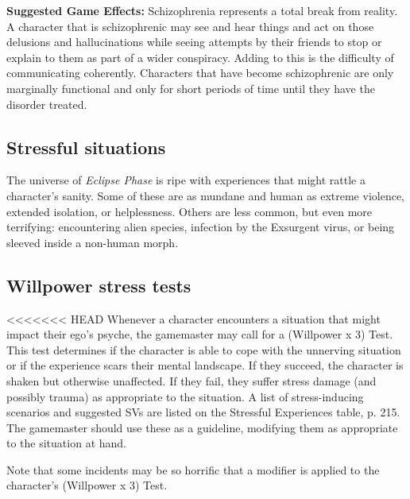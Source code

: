 \textbf{Suggested Game Effects:} Schizophrenia represents a total break from reality. A character that is schizophrenic may see and hear things and act on those delusions and hallucinations while seeing attempts by their friends to stop or explain to them as part of a wider conspiracy. Adding to this is the difficulty of communicating coherently. Characters that have become schizophrenic are only marginally functional and only for short periods of time until they have the disorder treated.


\subsection{Stressful situations}
\label{sec:stressful-situations}

The universe of \emph{Eclipse Phase} is ripe with experiences that might rattle a character’s sanity. Some of these are as mundane and human as extreme violence, extended isolation, or helplessness. Others are less common, but even more terrifying: encountering alien species, infection by the Exsurgent virus, or being sleeved inside a non-human morph.


\subsection{Willpower stress tests}
\label{sec:willpower-stress-tests}

<<<<<<< HEAD
Whenever a character encounters a situation that might impact their ego’s psyche, the gamemaster may call for a (Willpower x 3) Test. This test determines if the character is able to cope with the unnerving situation or if the experience scars their mental landscape. If they succeed, the character is shaken but otherwise unaffected. If they fail, they suffer stress damage (and possibly trauma) as appropriate to the situation. A list of stress-inducing scenarios and suggested SVs are listed on the Stressful Experiences table, p. 215. The gamemaster should use these as a guideline, modifying them as appropriate to the situation at hand.

Note that some incidents may be so horrific that a modifier is applied to the character’s (Willpower x 3) Test.

